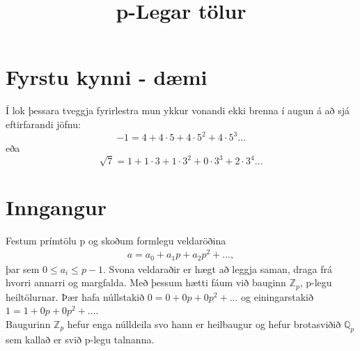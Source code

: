

\title{p-Legar tölur}

\maketitle
\section*{Fyrstu kynni - dæmi}
Í lok þessara tveggja fyrirlestra mun ykkur vonandi ekki brenna í augun á að sjá eftirfarandi jöfnu:
\begin{equation*}
-1 = 4 + 4\cdot 5+4\cdot 5^2+4\cdot 5^3 \ldots
\end{equation*}
eða 
\begin{equation*}
\sqrt{7} = 1 + 1\cdot 3 + 1\cdot 3^2+0\cdot 3^3+2\cdot 3^4 \ldots
\end{equation*}

\section*{Inngangur}
Festum prímtölu p og skoðum formlegu veldaröðina
\begin{align*}
a = a_0 + a_1 p + a_2 p^2 + ...,
\end{align*}
þar sem $0 \leq a_i \leq p-1$. 
Svona veldaraðir er hægt að leggja saman, draga frá hvorri annarri
 og margfalda.
Með þessum hætti fáum við bauginn $\mathbb{Z}_p$, p-legu heiltölurnar.
Þær hafa núllstakið $0 = 0+0p+0p^2+...$ og 
einingarstakið $1 = 1 + 0p+0p^2+...$.
\\Baugurinn $\mathbb{Z}_p$ hefur enga núlldeila svo hann er heilbaugur 
og hefur brotasviðið $\mathbb{Q}_p$ sem kallað er svið p-legu talnanna.
